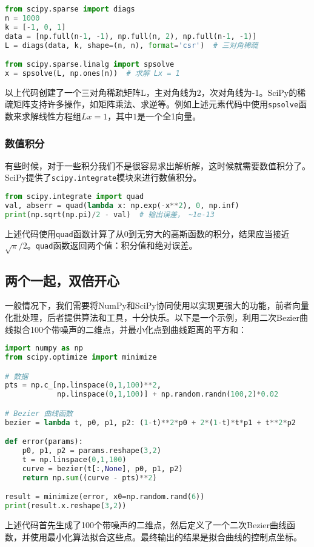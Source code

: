 \documentclass[../main.tex]{subfiles}
\begin{document}
\begin{lstlisting}[language=python]
from scipy.sparse import diags
n = 1000
k = [-1, 0, 1]
data = [np.full(n-1, -1), np.full(n, 2), np.full(n-1, -1)]
L = diags(data, k, shape=(n, n), format='csr')  # 三对角稀疏

from scipy.sparse.linalg import spsolve
x = spsolve(L, np.ones(n))  # 求解 Lx = 1
\end{lstlisting}
以上代码创建了一个三对角稀疏矩阵L，主对角线为2，次对角线为-1。SciPy的稀疏矩阵支持许多操作，如矩阵乘法、求逆等。例如上述元素代码中使用\texttt{spsolve}函数来求解线性方程组$Lx = 1$，其中$1$是一个全1向量。

\subsubsection{数值积分}

有些时候，对于一些积分我们不是很容易求出解析解，这时候就需要数值积分了。SciPy提供了\texttt{scipy.integrate}模块来进行数值积分。
\begin{lstlisting}[language=python]
from scipy.integrate import quad
val, abserr = quad(lambda x: np.exp(-x**2), 0, np.inf)
print(np.sqrt(np.pi)/2 - val)  # 输出误差， ~1e-13
\end{lstlisting}
上述代码使用\texttt{quad}函数计算了从0到无穷大的高斯函数的积分，结果应当接近$\sqrt{\pi}/2$。\texttt{quad}函数返回两个值：积分值和绝对误差。

\subsection{两个一起，双倍开心}

一般情况下，我们需要将NumPy和SciPy协同使用以实现更强大的功能，前者向量化批处理，后者提供算法和工具，十分快乐。以下是一个示例，利用二次Bezier曲线拟合100个带噪声的二维点，并最小化点到曲线距离的平方和：
\begin{lstlisting}[language=python]
import numpy as np
from scipy.optimize import minimize

# 数据
pts = np.c_[np.linspace(0,1,100)**2,
            np.linspace(0,1,100)] + np.random.randn(100,2)*0.02

# Bezier 曲线函数
bezier = lambda t, p0, p1, p2: (1-t)**2*p0 + 2*(1-t)*t*p1 + t**2*p2

def error(params):
    p0, p1, p2 = params.reshape(3,2)
    t = np.linspace(0,1,100)
    curve = bezier(t[:,None], p0, p1, p2)
    return np.sum((curve - pts)**2)

result = minimize(error, x0=np.random.rand(6))
print(result.x.reshape(3,2))
\end{lstlisting}
上述代码首先生成了100个带噪声的二维点，然后定义了一个二次Bezier曲线函数，并使用最小化算法拟合这些点。最终输出的结果是拟合曲线的控制点坐标。
\end{document}
